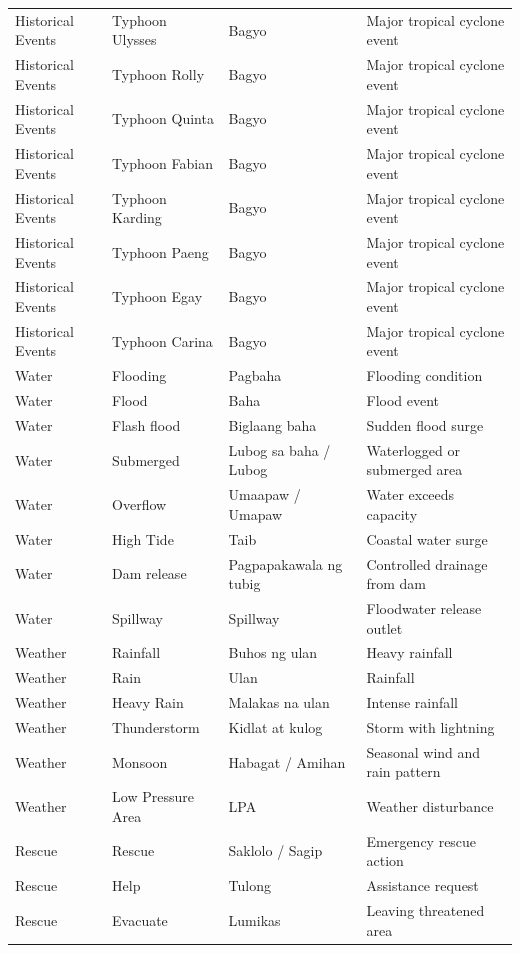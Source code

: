 \begin{longtable}{@{}p{} p{} p{} p{}@{}}
	Historical Events & Typhoon Ulysses & Bagyo & Major tropical cyclone event \\
	Historical Events & Typhoon Rolly & Bagyo & Major tropical cyclone event \\
	Historical Events & Typhoon Quinta & Bagyo & Major tropical cyclone event \\
	Historical Events & Typhoon Fabian & Bagyo & Major tropical cyclone event \\
	Historical Events & Typhoon Karding & Bagyo & Major tropical cyclone event \\
	Historical Events & Typhoon Paeng & Bagyo & Major tropical cyclone event \\
	Historical Events & Typhoon Egay & Bagyo & Major tropical cyclone event \\
	Historical Events & Typhoon Carina & Bagyo & Major tropical cyclone event \\
	Water & Flooding & Pagbaha & Flooding condition \\
	Water & Flood & Baha & Flood event \\
	Water & Flash flood & Biglaang baha & Sudden flood surge \\
	Water & Submerged & Lubog sa baha / Lubog & Waterlogged or submerged area \\
	Water & Overflow & Umaapaw / Umapaw & Water exceeds capacity \\
	Water & High Tide & Taib & Coastal water surge \\
	Water & Dam release & Pagpapakawala ng tubig & Controlled drainage from dam \\
	Water & Spillway & Spillway & Floodwater release outlet \\
	Weather & Rainfall & Buhos ng ulan & Heavy rainfall \\
	Weather & Rain & Ulan & Rainfall \\
	Weather & Heavy Rain & Malakas na ulan & Intense rainfall \\
	Weather & Thunderstorm & Kidlat at kulog & Storm with lightning \\
	Weather & Monsoon & Habagat / Amihan & Seasonal wind and rain pattern \\
	Weather & Low Pressure Area & LPA & Weather disturbance \\
	Rescue & Rescue & Saklolo / Sagip & Emergency rescue action \\
	Rescue & Help & Tulong & Assistance request \\
	Rescue & Evacuate & Lumikas & Leaving threatened area \\

\end{longtable}
